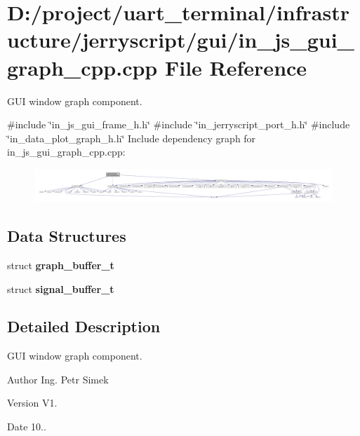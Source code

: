 \section{D\+:/project/uart\+\_\+terminal/infrastructure/jerryscript/gui/in\+\_\+js\+\_\+gui\+\_\+graph\+\_\+cpp.cpp File Reference}
\label{in__js__gui__graph__cpp_8cpp}


G\+UI window graph component.  


{\ttfamily \#include \char`\"{}in\+\_\+js\+\_\+gui\+\_\+frame\+\_\+h.\+h\char`\"{}}\newline
{\ttfamily \#include \char`\"{}in\+\_\+jerryscript\+\_\+port\+\_\+h.\+h\char`\"{}}\newline
{\ttfamily \#include \char`\"{}in\+\_\+data\+\_\+plot\+\_\+graph\+\_\+h.\+h\char`\"{}}\newline
Include dependency graph for in\+\_\+js\+\_\+gui\+\_\+graph\+\_\+cpp.\+cpp\+:
\nopagebreak
\begin{figure}[H]
\begin{center}
\leavevmode
\includegraphics[width=350pt]{in__js__gui__graph__cpp_8cpp__incl}
\end{center}
\end{figure}
\subsection*{Data Structures}
\begin{DoxyCompactItemize}
\item 
struct \textbf{ graph\+\_\+buffer\+\_\+t}
\item 
struct \textbf{ signal\+\_\+buffer\+\_\+t}
\end{DoxyCompactItemize}


\subsection{Detailed Description}
G\+UI window graph component. 

\begin{DoxyAuthor}{Author}
Ing. Petr Simek 
\end{DoxyAuthor}
\begin{DoxyVersion}{Version}
V1. 
\end{DoxyVersion}
\begin{DoxyDate}{Date}
10.. 
\end{DoxyDate}

